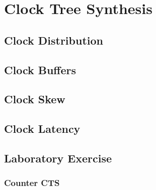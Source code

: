 \chapter{Clock Tree Synthesis}

\section{Clock Distribution}

\section{Clock Buffers}

\section{Clock Skew}

\section{Clock Latency}

\section{Laboratory Exercise}

\subsection*{Counter CTS}
